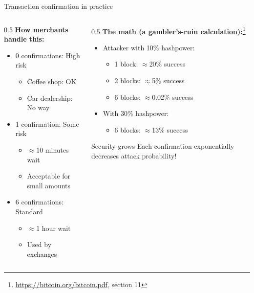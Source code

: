 \ifdefined\PRESENTATION\else\PassOptionsToClass{handout}{beamer}\fi\documentclass[aspectratio=169, lualatex]{beamer}
\begin{document}
\begin{frame}{Transaction confirmation in practice}
	\begin{columns}[c]
		\begin{column}{0.5\textwidth}
			\textbf{How merchants handle this:}
			\begin{itemize}
				\item 0 confirmations: High risk
				      \begin{itemize}
					      \item Coffee shop: OK
					      \item Car dealership: No way
				      \end{itemize}
				\item 1 confirmation: Some risk
				      \begin{itemize}
					      \item $\approx$10 minutes wait
					      \item Acceptable for small amounts
				      \end{itemize}
				\item 6 confirmations: Standard
				      \begin{itemize}
					      \item $\approx$1 hour wait
					      \item Used by exchanges
				      \end{itemize}
			\end{itemize}
		\end{column}
		\begin{column}{0.5\textwidth}
			\textbf{The math (a gambler's-ruin calculation):}\footnote{\url{https://bitcoin.org/bitcoin.pdf}, section 11}
			\begin{itemize}
				\item Attacker with 10\% hashpower:
				      \begin{itemize}
					      \item 1 block: $\approx$20\% success
					      \item 2 blocks: $\approx$5\% success
					      \item 6 blocks: $\approx$0.02\% success
				      \end{itemize}
				\item With 30\% hashpower:
				      \begin{itemize}
					      \item 6 blocks: $\approx$13\% success
				      \end{itemize}
			\end{itemize}
			\begin{exampleblock}{Security grows}
				Each confirmation exponentially decreases attack probability!
			\end{exampleblock}
		\end{column}
	\end{columns}
\end{frame}
\end{document}
